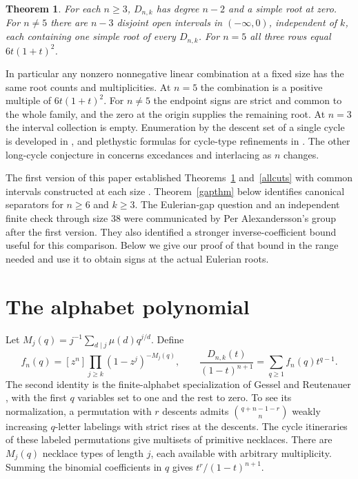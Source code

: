 \documentclass[11pt]{article}
\newtheorem{theorem}{Theorem}
\begin{document}
\begin{theorem}\label{main}
For each $n\ge3$, $D_{n,k}$ has degree $n-2$ and a simple root at zero. For $n\ne5$ there are $n-3$ disjoint open intervals in $(-\infty,0)$, independent of $k$, each containing one simple root of every $D_{n,k}$. For $n=5$ all three rows equal $6t(1+t)^2$.
\end{theorem}
In particular any nonzero nonnegative linear combination at a fixed size has the same root counts and multiplicities. At $n=5$ the combination is a positive multiple of $6t(1+t)^2$. For $n\ne5$ the endpoint signs are strict and common to the whole family, and the zero at the origin supplies the remaining root. At $n=3$ the interval collection is empty. Enumeration by the descent set of a single cycle is developed in \cite{et}, and plethystic formulas for cycle-type refinements in \cite{gz}. The other long-cycle conjecture in \cite{open} concerns excedances and interlacing as $n$ changes.

The first version of this paper established Theorems~\ref{main} and~\ref{allcuts} with common intervals constructed at each size \cite{v1}. Theorem~\ref{gapthm} below identifies canonical separators for $n\ge6$ and $k\ge3$. The Eulerian-gap question and an independent finite check through size 38 were communicated by Per Alexandersson's group after the first version. They also identified a stronger inverse-coefficient bound useful for this comparison. Below we give our proof of that bound in the range needed and use it to obtain signs at the actual Eulerian roots.

\section{The alphabet polynomial}
Let $M_j(q)=j^{-1}\sum_{d\mid j}\mu(d)q^{j/d}$. Define
\begin{equation}\label{letter}
 f_n(q)=[z^n]\prod_{j\ge k}(1-z^j)^{-M_j(q)},\qquad
 \frac{D_{n,k}(t)}{(1-t)^{n+1}}=\sum_{q\ge1}f_n(q)t^{q-1}.
\end{equation}
The second identity is the finite-alphabet specialization of Gessel and Reutenauer \cite[Theorem~3.6]{gr}, with the first $q$ variables set to one and the rest to zero. To see its normalization, a permutation with $r$ descents admits $\binom{q+n-1-r}{n}$ weakly increasing $q$-letter labelings with strict rises at the descents. The cycle itineraries of these labeled permutations give multisets of primitive necklaces. There are $M_j(q)$ necklace types of length $j$, each available with arbitrary multiplicity. Summing the binomial coefficients in $q$ gives $t^r/(1-t)^{n+1}$.
\end{document}
